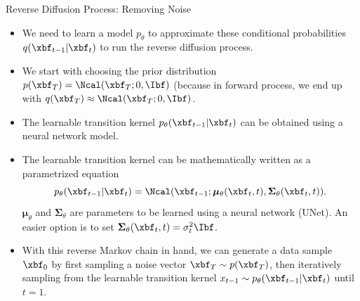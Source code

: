 \documentclass[aspectratio=169,xcolor=dvipsnames,svgnames,x11names,fleqn]{beamer}
\begin{document}
    \begin{frame}{Reverse Diffusion Process: Removing Noise}
    \begin{itemize}
        \item We need to learn a model $p_\theta$ to approximate these conditional probabilities $q(\xbf_{t-1}|\xbf_t)$  to run the reverse diffusion process.
        \item We start with choosing the prior distribution $p(\xbf_T) = \Ncal(\xbf_T; 0, \Ibf)$ (because in forward process, we end up with $q(\xbf_T)\approx \Ncal(\xbf_T; 0, \Ibf)$.
        \item The learnable transition kernel $p_\theta(\xbf_{t-1}|\xbf_t)$ can be obtained using a neural network model.
        \item The learnable transition kernel can be mathematically written as a parametrized equation
        $$
        p_\theta(\xbf_{t-1}|\xbf_t) = \Ncal(\xbf_{t-1};\bm\mu_\theta (\xbf_t, t), \bm\Sigma_\theta (\xbf_t, t)).
        $$
        $\bm\mu_\theta$ and $\bm\Sigma_\theta$ are parameters to be learned using a neural network (UNet).  An easier option is to set $\bm\Sigma_\theta (\xbf_t, t) = \sigma_t^2 \Ibf$.
        
        \item With this reverse Markov chain in hand, we can generate a data sample $\xbf_0$ by first sampling a noise vector $\xbf_T \sim p(\xbf_T )$, then iteratively sampling from the learnable
    transition kernel $x_{t-1} \sim p_\theta(\xbf_{t-1}|\xbf_t)$ until $t = 1$.
    \end{itemize}
    \end{frame}
    
\end{document}
